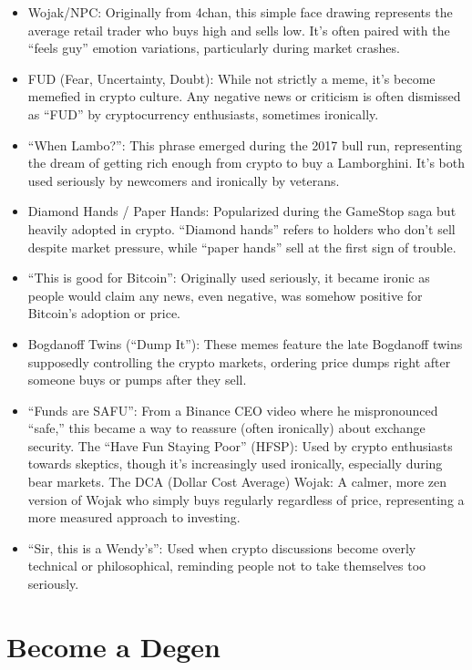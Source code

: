 \documentclass[
  letterpaper,
  DIV=11,
  numbers=noendperiod]{scrreprt}
\providecommand{\tightlist}{%
  \setlength{\itemsep}{0pt}\setlength{\parskip}{0pt}}\usepackage{longtable,booktabs,array}
\begin{document}
\begin{itemize}
\tightlist
\item
  Wojak/NPC: Originally from 4chan, this simple face drawing represents
  the average retail trader who buys high and sells low. It's often
  paired with the ``feels guy'' emotion variations, particularly during
  market crashes.
\item
  FUD (Fear, Uncertainty, Doubt): While not strictly a meme, it's become
  memefied in crypto culture. Any negative news or criticism is often
  dismissed as ``FUD'' by cryptocurrency enthusiasts, sometimes
  ironically.
\item
  ``When Lambo?'': This phrase emerged during the 2017 bull run,
  representing the dream of getting rich enough from crypto to buy a
  Lamborghini. It's both used seriously by newcomers and ironically by
  veterans.
\item
  Diamond Hands / Paper Hands: Popularized during the GameStop saga but
  heavily adopted in crypto. ``Diamond hands'' refers to holders who
  don't sell despite market pressure, while ``paper hands'' sell at the
  first sign of trouble.
\item
  ``This is good for Bitcoin'': Originally used seriously, it became
  ironic as people would claim any news, even negative, was somehow
  positive for Bitcoin's adoption or price.
\item
  Bogdanoff Twins (``Dump It''): These memes feature the late Bogdanoff
  twins supposedly controlling the crypto markets, ordering price dumps
  right after someone buys or pumps after they sell.
\item
  ``Funds are SAFU'': From a Binance CEO video where he mispronounced
  ``safe,'' this became a way to reassure (often ironically) about
  exchange security. The ``Have Fun Staying Poor'' (HFSP): Used by
  crypto enthusiasts towards skeptics, though it's increasingly used
  ironically, especially during bear markets. The DCA (Dollar Cost
  Average) Wojak: A calmer, more zen version of Wojak who simply buys
  regularly regardless of price, representing a more measured approach
  to investing.
\item
  ``Sir, this is a Wendy's'': Used when crypto discussions become overly
  technical or philosophical, reminding people not to take themselves
  too seriously.
\end{itemize}

\part{Become a Degen}
\end{document}
